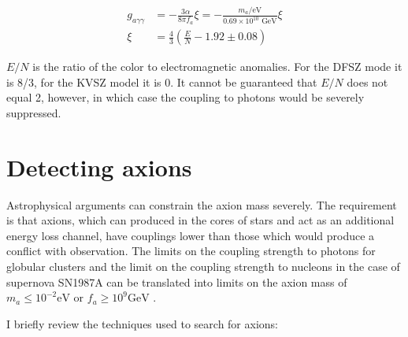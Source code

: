 \documentclass[12pt,twosides]{book}
\begin{document}
\begin{align*}
g_{a\gamma\gamma} &= -\frac{3\alpha}{8\pi f_a}\xi = - \frac{m_a/\text{eV}}{0.69\times10^{10}\text{ GeV}}\xi 
\\ \xi &= \frac{4}{3}(\frac{E}{N} - 1.92 \pm 0.08)
\end{align*}

$E/N$ is the ratio of the color to electromagnetic anomalies. For the DFSZ mode it is 8/3, for the KVSZ model it is 0. It cannot be guaranteed that $E/N$ does not equal 2, however, in which case the coupling to photons would be severely suppressed.


\section{Detecting axions}

Astrophysical arguments can constrain the axion mass severely. The requirement is that axions, which can produced in the cores of stars and act as an additional energy loss channel, have couplings lower than those which would produce a conflict with observation. The limits on the coupling strength to photons for globular clusters and the limit on the coupling strength to nucleons in the case of supernova SN1987A can be translated into limits on the axion mass of $m_a \leq 10^{-2} \text{eV}$ or $f_a \geq 10^9\text{GeV}$ \cite{raffelt08}.

I briefly review the techniques used to search for axions:
\end{document}
